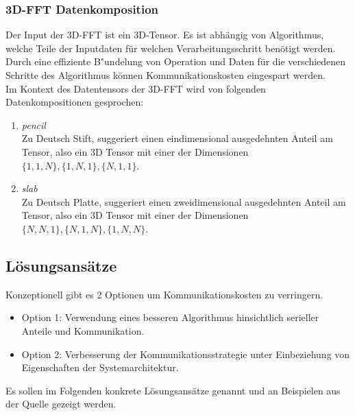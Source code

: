 \subsubsection{3D-FFT Datenkomposition}
Der Input der 3D-FFT ist ein 3D-Tensor. Es ist abhängig von Algorithmus, welche Teile der Inputdaten für welchen Verarbeitungsschritt benötigt werden.
Durch eine effiziente B"undelung von Operation und Daten für die verschiedenen Schritte des Algorithmus können Kommunikationskosten eingespart werden.\\
Im Kontext des Datentensors der 3D-FFT wird von folgenden Datenkompositionen gesprochen:
\begin{enumerate}
	\item \textit{pencil}\\
		Zu Deutsch Stift, suggeriert einen eindimensional ausgedehnten Anteil am Tensor, also ein 3D Tensor mit einer der Dimensionen $\{1,1,N\},\{1,N,1\},\{N,1,1\}$.
	\item \textit{slab}\\
		Zu Deutsch Platte, suggeriert einen zweidimensional ausgedehnten Anteil am Tensor, also ein 3D Tensor mit einer der Dimensionen $\{N,N,1\},\{N,1,N\},\{1,N,N\}$.
\end{enumerate}

\subsection{Lösungsansätze}
Konzeptionell gibt es 2 Optionen um Kommunikationskosten zu verringern.
\begin{itemize}
	\item Option 1: Verwendung eines besseren Algorithmus hinsichtlich serieller Anteile und Kommunikation.
	\item Option 2: Verbesserung der Kommunikationsstrategie unter Einbeziehung von Eigenschaften der Systemarchitektur.
\end{itemize}
Es sollen im Folgenden konkrete Lösungsansätze genannt und an Beispielen aus der Quelle \cite{mainpaper} gezeigt werden.

